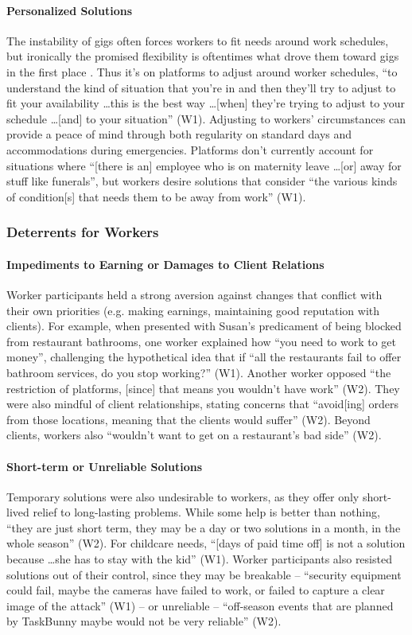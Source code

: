 \paragraph{Personalized Solutions} \label{personalized}
The instability of gigs often forces workers to fit needs around work schedules, but ironically the promised flexibility is oftentimes what drove them toward gigs in the first place \cite{lee2015working}. Thus it's on platforms to adjust around worker schedules, ``to understand the kind of situation that you're in and then they'll try to adjust to fit your availability \dots this is the best way \dots [when] they're trying to adjust to your schedule \dots [and] to your situation'' (W1). Adjusting to workers' circumstances can provide a peace of mind through both regularity on standard days and accommodations during emergencies. Platforms don't currently account for situations where ``[there is an] employee who is on maternity leave \dots [or] away for stuff like funerals'', but workers desire solutions that consider ``the various kinds of condition[s] that needs them to be away from work'' (W1).

\subsubsection{Deterrents for Workers}
\paragraph{Impediments to Earning or Damages to Client Relations}
Worker participants held a strong aversion against changes that conflict with their own priorities (e.g. making earnings, maintaining good reputation with clients). For example, when presented with Susan's predicament of being blocked from restaurant bathrooms, one worker explained how ``you need to work to get money'', challenging the hypothetical idea that if ``all the restaurants fail to offer bathroom services, do you stop working?'' (W1). Another worker opposed ``the restriction of platforms, [since] that means you wouldn't have work'' (W2). They were also mindful of client relationships, stating concerns that ``avoid[ing] orders from those locations, meaning that the clients would suffer'' (W2). 
Beyond clients, workers also ``wouldn't want to get on a restaurant's bad side'' (W2).


\paragraph{Short-term or Unreliable Solutions}
Temporary solutions were also undesirable to workers, as they offer only short-lived relief to long-lasting problems. While some help is better than nothing, ``they are just short term, they may be a day or two solutions in a month, in the whole season'' (W2). For childcare needs, ``[days of paid time off] is not a solution because \dots she has to stay with the kid'' (W1). Worker participants also resisted solutions out of their control, since they may be breakable -- ``security equipment could fail, maybe the cameras have failed to work, or failed to capture a clear image of the attack'' (W1) -- or unreliable -- ``off-season events that are planned by TaskBunny maybe would not be very reliable'' (W2).

